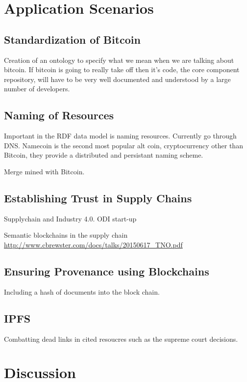 \documentclass[runningheads,a4paper]{llncs}
\begin{document}
\section{Application Scenarios}

\subsection{Standardization of Bitcoin}

Creation of an ontology to specify what we mean when we are talking about bitcoin. If bitcoin is going to really take off then it's code, the core component repository, will have to be very well documented and understood by a large number of developers. 

\subsection{Naming of Resources}

Important in the RDF data model is naming resources. Currently go through DNS. Namecoin is the second most popular alt coin, cryptocurrency other than Bitcoin, they provide a distributed and persistant naming scheme. 

Merge mined with Bitcoin. 

\subsection{Establishing Trust in Supply Chains}

Supplychain and Industry 4.0. ODI start-up

Semantic blockchains in the supply chain
\url{http://www.cbrewster.com/docs/talks/20150617_TNO.pdf}

\subsection{Ensuring Provenance using Blockchains}

Including a hash of documents into the block chain. 

\subsection{IPFS}

Combatting dead links in cited resoucres such as the supreme court decisions. 

\section{Discussion}
\end{document}
